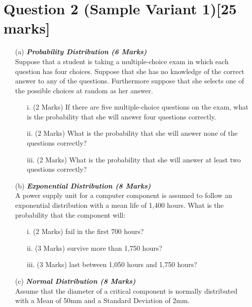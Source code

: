 \documentclass[]{article}
\begin{document}
\section*{Question 2 (Sample Variant 1)[25 marks]}
\begin{itemize}

\item[(a)] \textbf{\textit{Probability Distribution (6 Marks)}}\\ %
Suppose that a student is taking a multiple-choice exam in which each question has four choices.
Suppose that she has no knowledge of the correct answer to any of the questions. Furthermore suppose that she selects one of the possible choices at random as her answer.
\begin{itemize}
\item [i.](2 Marks) If there are five multiple-choice questions on the exam, what is the probability that she will answer four questions correctly.
\item [ii.](2 Marks) What is the probability that she will answer none of the questions correctly?
\item [iii.](2 Marks) What is the probability that she will answer at least two questions correctly?
\end{itemize}

\item[(b)] \textbf{\textit{Exponential Distribution (8 Marks)}}\\ %
A power supply unit for a computer component is assumed to follow an exponential distribution with a mean life of 1,400 hours.  What is the probability that the component will:
\begin{itemize}
\item [i.](2 Marks)	fail in the first 700 hours?
\item [ii.](3 Marks) survive more than 1,750 hours?
\item [iii.](3 Marks) last between 1,050 hours and 1,750 hours?
\end{itemize}


\item[(c)] \textbf{\textit{Normal Distribution (8 Marks)}}\\
Assume that the diameter of a critical component is normally distributed with a Mean of 50mm and a Standard Deviation of 2mm.


\end{itemize}
\end{document}
